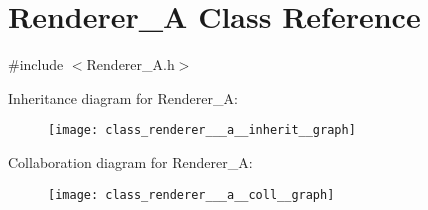 \hypertarget{class_renderer___a}{\section{Renderer\-\_\-\-A Class Reference}
\label{class_renderer___a}
}


{\ttfamily \#include $<$Renderer\-\_\-\-A.\-h$>$}



Inheritance diagram for Renderer\-\_\-\-A\-:\nopagebreak
\begin{figure}[H]
\begin{center}
\leavevmode
\texttt{[image: class\_renderer\_\_\_a\_\_inherit\_\_graph]}
\end{center}
\end{figure}


Collaboration diagram for Renderer\-\_\-\-A\-:\nopagebreak
\begin{figure}[H]
\begin{center}
\leavevmode
\texttt{[image: class\_renderer\_\_\_a\_\_coll\_\_graph]}
\end{center}
\end{figure}
